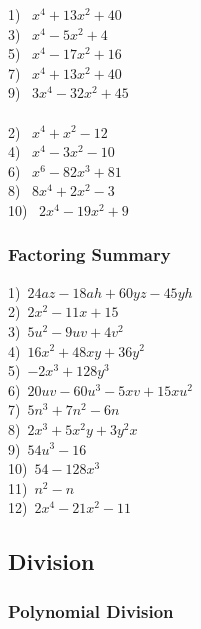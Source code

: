 {}

\begin{multicols}{2}
  1)~ $x^4 +13x^2+40$\\
  3)~ $x^4-5x^2+4$\\
  5)~ $x^4 -17x^2+16$\\
  7)~ $x^4 +13x^2+40$\\
  9)~ $3x^4 -32x^2+45$\\
~\\
	2)~ $x^4 +x^2-12$\\
  4)~ $x^4 -3x^2-10$\\
  6)~ $x^6 -82x^3+81$\\
  8)~ $8x^4 +2x^2-3$\\
  10)~ $2x^4 -19x^2+9$%
  
\end{multicols}

\subsubsection{Factoring Summary}

{}\pp

  1)~$24 a z - 18 a h + 60 y z - 45 y h$\\
  2)~$2 x^2 - 11 x + 15$\\
  3)~$5 u^2 - 9 u v + 4 v^2$\\
  4)~$16 x^2 + 48 x y + 36 y^2$\\
  5)~$- 2 x^3 + 128 y^3$\\
  6)~$20 u v - 60 u^3 - 5 x v + 15 x u^2$\\
  7)~$5 n^3 + 7 n^2 - 6 n$\\
  8)~$2 x^3 + 5 x^2 y + 3 y^2 x$\\
  9)~$54 u^3 - 16$\\
  10)~$54 - 128 x^3$\\
  11)~$n^2 - n$\\
  12)~$2x^4 -21x^2-11$

\newpage

\subsection{Division}
\subsubsection{Polynomial Division}

